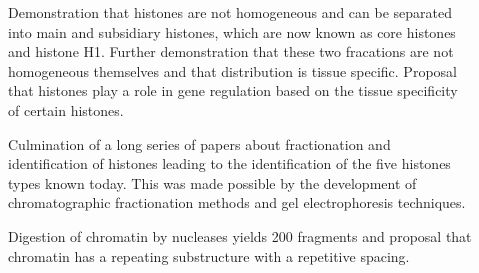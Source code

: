 \begin{description}
        \item[\cite{stedman1951main-histones-separation}]
        Demonstration that histones are not homogeneous and can be
        separated into main and subsidiary histones,
        which are now known as core histones and histone H1.
        Further demonstration that these two fracations are not
        homogeneous themselves and that distribution is tissue specific.
        Proposal that histones play a role in gene regulation based
        on the tissue specificity of certain histones.

        \item[\cite{philips-and-johns1965-fractionation}]
        Culmination of a long series of papers about fractionation and
        identification of histones leading to the identification of
        the five histones types known today.
        This was made possible by the development of chromatographic
        fractionation methods and gel electrophoresis techniques.

        \item[\cite{hewish1973-200bp-pieces}]
        Digestion of chromatin by nucleases yields \SI{200}{\bp}
        fragments and proposal that chromatin has a repeating
        substructure with a repetitive spacing.


\end{description}
